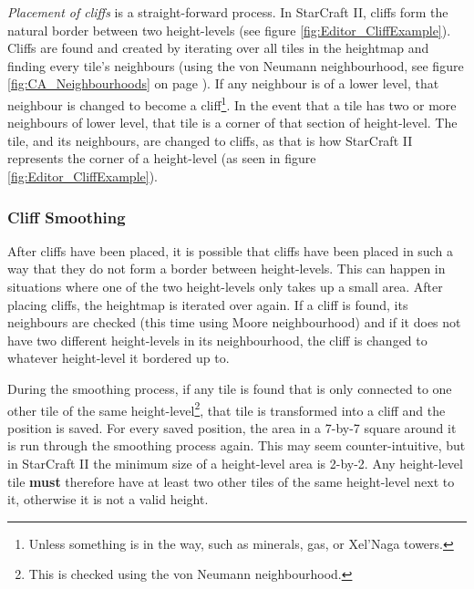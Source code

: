 \textit{Placement of cliffs} is a straight-forward process. In StarCraft II, cliffs form the natural border between two height-levels (see figure \ref{fig:Editor_CliffExample}). Cliffs are found and created by iterating over all tiles in the heightmap and finding every tile's neighbours (using the von Neumann neighbourhood, see figure \ref{fig:CA_Neighbourhoods} on page \pageref{fig:CA_Neighbourhoods}). If any neighbour is of a lower level, that neighbour is changed to become a cliff\footnote{Unless something is in the way, such as minerals, gas, or Xel'Naga towers.}. In the event that a tile has two or more neighbours of lower level, that tile is a corner of that section of height-level. The tile, and its neighbours, are changed to cliffs, as that is how StarCraft II represents the corner of a height-level (as seen in figure \ref{fig:Editor_CliffExample}).


\subsubsection{Cliff Smoothing}

After cliffs have been placed, it is possible that cliffs have been placed in such a way that they do not form a border between height-levels. This can happen in situations where one of the two height-levels only takes up a small area. After placing cliffs, the heightmap is iterated over again. If a cliff is found, its neighbours are checked (this time using Moore neighbourhood) and if it does not have two different height-levels in its neighbourhood, the cliff is changed to whatever height-level it bordered up to. 

During the smoothing process, if any tile is found that is only connected to one other tile of the same height-level\footnote{This is checked using the von Neumann neighbourhood.}, that tile is transformed into a cliff and the position is saved. For every saved position, the area in a 7-by-7 square around it is run through the smoothing process again. This may seem counter-intuitive, but in StarCraft II the minimum size of a height-level area is 2-by-2. Any height-level tile \textbf{must} therefore have at least two other tiles of the same height-level next to it, otherwise it is not a valid height.

